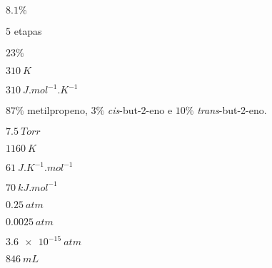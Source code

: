 \begin{answers}
\begin{answers}
\end{answers}

\item 
\begin{answers}
[start = 1]\item \(\num{8,1}\%\)

\item 5 etapas

\item \(\num{23}\%\)

\end{answers}

\item 
\begin{answers}
[start = 1]\item \(\qty{310}{\unit{K}}\)

\item \(\qty{310}{\unit{J.mol^{-1}.K^{-1}}}\)

\end{answers}

\item \(87\%\) metilpropeno, \(3\%\) \emph{cis}-but-2-eno e \(10\%\) \emph{trans}-but-2-eno.

\item \(\qty{7,5}{\unit{Torr}}\)

\item 
\begin{answers}
[start = 1]\item \(\qty{1160}{\unit{K}}\)

\item \(\qty{61}{\unit{J.K^{-1}.mol^{-1}}}\)

\item \(\qty{70}{\unit{kJ.mol^{-1}}}\)

\end{answers}

\item 
\begin{answers}
[start = 1]\item \(\qty{0,25}{\unit{atm}}\)

\item \(\qty{0,0025}{\unit{atm}}\)

\end{answers}

\item 
\begin{answers}
[start = 1]\item \(\qty{3,6e-15}{\unit{atm}}\)

\item \(\qty{846}{\unit{mL}}\)

\end{answers}

\end{answers}

